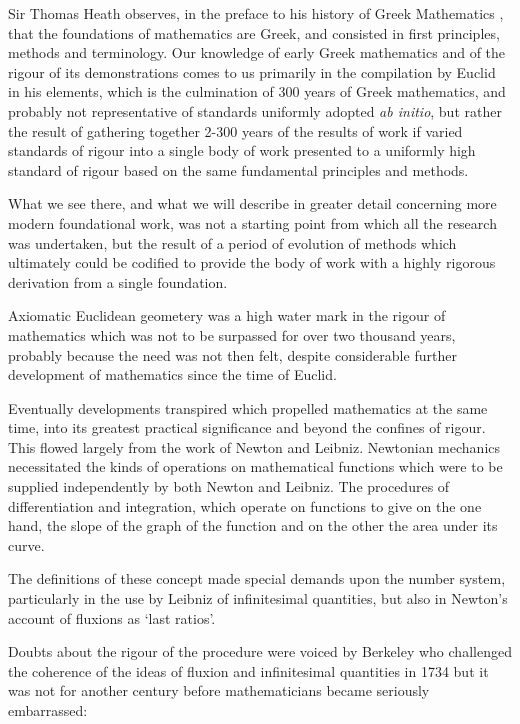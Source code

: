 \documentclass[10pt,titlepage]{book}
\begin{document}
Sir Thomas Heath observes, in the preface to his history of Greek Mathematics \cite{heath1921}, that the foundations of mathematics are Greek, and consisted in first principles, methods and terminology.
Our knowledge of early Greek mathematics and of the rigour of its demonstrations comes to us primarily in the compilation by Euclid in his elements, which is the culmination of 300 years of Greek mathematics, and probably not representative of standards uniformly adopted \emph{ab initio}, but rather the result of gathering together 2-300 years of the results of work if varied standards of rigour into a single body of work presented to a uniformly high standard of rigour based on the same fundamental principles and methods.

What we see there, and what we will describe in greater detail concerning more modern foundational work, was not a starting point from which all the research was undertaken, but the result of a period of evolution of methods which ultimately could be codified to provide the body of work with a highly rigorous derivation from a single  foundation.

Axiomatic Euclidean geometery was a high water mark in the rigour of mathematics which was not to be surpassed for over two thousand years, probably because the need was not then felt, despite considerable further development of mathematics since the time of Euclid.

Eventually developments transpired which propelled mathematics at the same time, into its greatest practical significance and beyond the confines of rigour.
This flowed largely from the work of Newton and Leibniz.
Newtonian mechanics necessitated the kinds of operations on mathematical functions which were to be supplied independently by both Newton and Leibniz.
The procedures of differentiation and integration, which operate on functions to give on the one hand, the slope of the graph of the function and on the other the area under its curve.

The definitions of these concept made special demands upon the number system, particularly in the use by Leibniz of infinitesimal quantities, but also in Newton's account of fluxions as `last ratios'.

Doubts about the rigour of the procedure were voiced by Berkeley
who challenged the coherence of the ideas of fluxion and infinitesimal quantities\cite{berkeley2018analyst} in 1734 but it was not for another century before mathematicians became seriously embarrassed:
\end{document}

